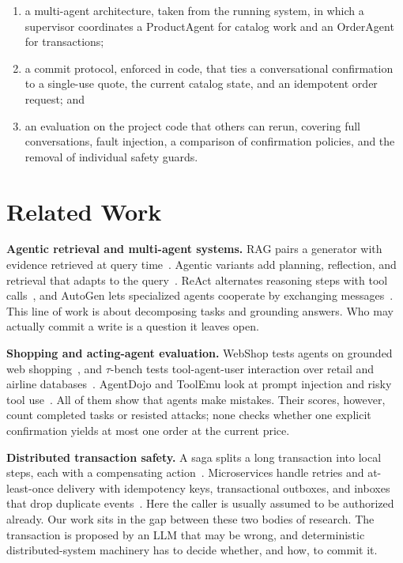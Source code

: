 \documentclass{IEEEtran}
\begin{document}
\begin{enumerate}
\item a multi-agent architecture, taken from the running system, in which a supervisor coordinates a ProductAgent for catalog work and an OrderAgent for transactions;
\item a commit protocol, enforced in code, that ties a conversational confirmation to a single-use quote, the current catalog state, and an idempotent order request; and
\item an evaluation on the project code that others can rerun, covering full conversations, fault injection, a comparison of confirmation policies, and the removal of individual safety guards.
\end{enumerate}

\section{Related Work}

\textbf{Agentic retrieval and multi-agent systems.} RAG pairs a generator with evidence retrieved at query time~\cite{lewis2020rag,gao2023ragsurvey}. Agentic variants add planning, reflection, and retrieval that adapts to the query~\cite{singh2025agenticrag}. ReAct alternates reasoning steps with tool calls~\cite{yao2023react}, and AutoGen lets specialized agents cooperate by exchanging messages~\cite{wu2023autogen}. This line of work is about decomposing tasks and grounding answers. Who may actually commit a write is a question it leaves open.

\textbf{Shopping and acting-agent evaluation.} WebShop tests agents on grounded web shopping~\cite{yao2022webshop}, and $\tau$-bench tests tool-agent-user interaction over retail and airline databases~\cite{yao2024taubench}. AgentDojo and ToolEmu look at prompt injection and risky tool use~\cite{debenedetti2024agentdojo,ruan2024toolemu}. All of them show that agents make mistakes. Their scores, however, count completed tasks or resisted attacks; none checks whether one explicit confirmation yields at most one order at the current price.

\textbf{Distributed transaction safety.} A saga splits a long transaction into local steps, each with a compensating action~\cite{garciamolina1987sagas}. Microservices handle retries and at-least-once delivery with idempotency keys, transactional outboxes, and inboxes that drop duplicate events~\cite{helland2012idempotence,richardson2018microservices,kreps2011kafka}. Here the caller is usually assumed to be authorized already. Our work sits in the gap between these two bodies of research. The transaction is proposed by an LLM that may be wrong, and deterministic distributed-system machinery has to decide whether, and how, to commit it.
\end{document}
